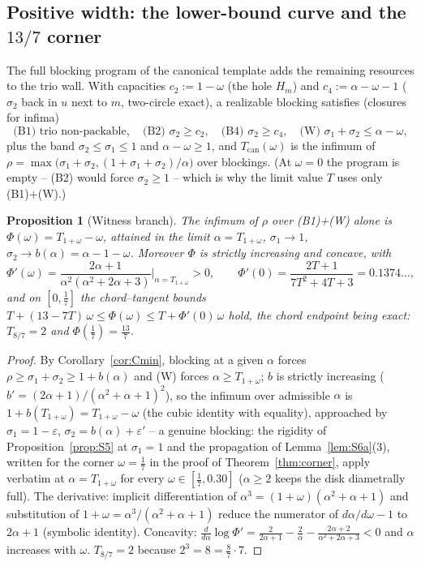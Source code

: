 \documentclass[11pt]{article}
\newtheorem{proposition}[theorem]{Proposition}
\theoremstyle{definition}
\begin{document}
\subsection{Positive width: the lower-bound curve and the \texorpdfstring{$13/7$}{13/7} corner}
\label{app:corner}

The full blocking program of the canonical template adds the remaining
resources to the trio wall. With capacities $c_2:=1-\omega$ (the hole
$H_m$) and $c_4:=\alpha-\omega-1$ ($\sigma_2$ back in $u$ next to $m$,
two-circle exact), a realizable blocking satisfies (closures for infima)
\[
\text{(B1) trio non-packable},\quad
\text{(B2) }\sigma_2\ge c_2,\quad
\text{(B4) }\sigma_2\ge c_4,\quad
\text{(W) }\sigma_1+\sigma_2\le\alpha-\omega,
\]
plus the band $\sigma_2\le\sigma_1\le1$ and $\alpha-\omega\ge1$, and
$T_{\mathrm{can}}(\omega)$ is the infimum of
$\rho=\max\bigl(\sigma_1+\sigma_2,(1+\sigma_1+\sigma_2)/\alpha\bigr)$ over
blockings. (At $\omega=0$ the program is empty -- (B2) would force
$\sigma_2\ge1$ -- which is why the limit value $T$ uses only (B1)+(W).)

\begin{proposition}[Witness branch]\label{prop:Cwitness}
The infimum of $\rho$ over (B1)+(W) alone is
$\Phi(\omega)=T_{1+\omega}-\omega$, attained in the limit
$\alpha=T_{1+\omega}$, $\sigma_1\to1$, $\sigma_2\to b(\alpha)=
\alpha-1-\omega$. Moreover $\Phi$ is strictly increasing and concave, with
\[
\Phi'(\omega)=\frac{2\alpha+1}{\alpha^2(\alpha^2+2\alpha+3)}
\Big|_{\alpha=T_{1+\omega}}>0,\qquad
\Phi'(0)=\frac{2T+1}{7T^2+4T+3}=0.1374\dots,
\]
and on $[0,\tfrac17]$ the chord--tangent bounds
$T+(13-7T)\,\omega\le\Phi(\omega)\le T+\Phi'(0)\,\omega$ hold, the chord
endpoint being exact: $T_{8/7}=2$ and $\Phi(\tfrac17)=\tfrac{13}7$.
\end{proposition}
\begin{proof}
By Corollary~\ref{cor:Cmin}, blocking at a given $\alpha$ forces
$\rho\ge\sigma_1+\sigma_2\ge1+b(\alpha)$ and (W) forces
$\alpha\ge T_{1+\omega}$; $b$ is strictly increasing
($b'=(2\alpha+1)/(\alpha^2+\alpha+1)^2$), so the infimum over admissible
$\alpha$ is $1+b(T_{1+\omega})=T_{1+\omega}-\omega$ (the cubic identity
with equality), approached by $\sigma_1=1-\varepsilon$,
$\sigma_2=b(\alpha)+\varepsilon'$ -- a genuine blocking: the rigidity of
Proposition~\ref{prop:S5} at $\sigma_1=1$ and the propagation of
Lemma~\ref{lem:S6a}(3), written for the corner $\omega=\tfrac17$ in the
proof of Theorem~\ref{thm:corner}, apply verbatim at $\alpha=T_{1+\omega}$
for every $\omega\in[\tfrac17,0.30]$ ($\alpha\ge2$ keeps the disk
diametrally full). The derivative: implicit
differentiation of $\alpha^3=(1+\omega)(\alpha^2+\alpha+1)$ and
substitution of $1+\omega=\alpha^3/(\alpha^2+\alpha+1)$ reduce the
numerator of $d\alpha/d\omega-1$ to $2\alpha+1$ (symbolic identity).
Concavity: $\frac{d}{d\alpha}\log\Phi'=\frac{2}{2\alpha+1}-\frac2\alpha
-\frac{2\alpha+2}{\alpha^2+2\alpha+3}<0$ and $\alpha$ increases with
$\omega$. $T_{8/7}=2$ because $2^3=8=\tfrac87\cdot7$.
\end{proof}
\end{document}
